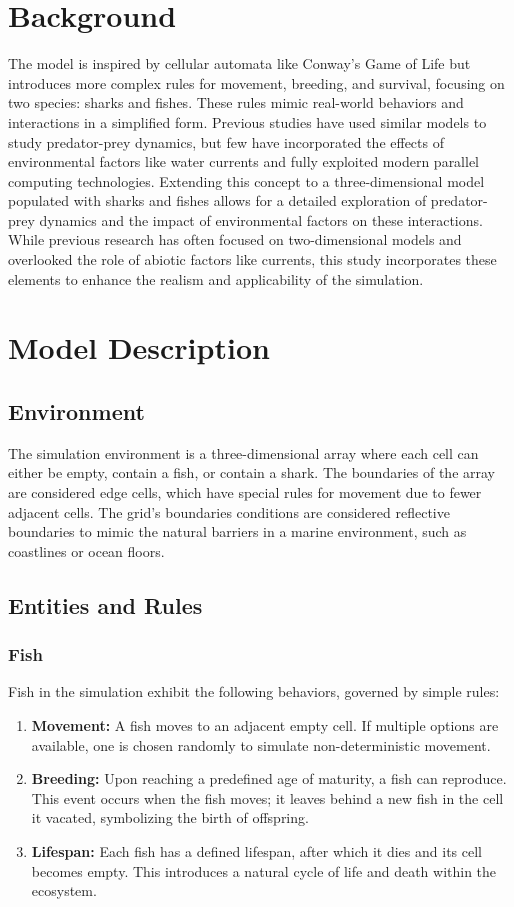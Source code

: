 \documentclass[conference,compsoc]{IEEEtran}
\begin{document}
\section{Background}
The model is inspired by cellular automata like Conway's Game of Life but introduces more complex rules for movement, breeding, and survival, focusing on two species: sharks and fishes. These rules mimic real-world behaviors and interactions in a simplified form. Previous studies have used similar models to study predator-prey dynamics, but few have incorporated the effects of environmental factors like water currents and fully exploited modern parallel computing technologies. Extending this concept to a three-dimensional model populated with sharks and fishes allows for a detailed exploration of predator-prey dynamics and the impact of environmental factors on these interactions. While previous research has often focused on two-dimensional models and overlooked the role of abiotic factors like currents, this study incorporates these elements to enhance the realism and applicability of the simulation. 


\section{Model Description}

\subsection{Environment}
The simulation environment is a three-dimensional array where each cell can either be empty, contain a fish, or contain a shark. The boundaries of the array are considered edge cells, which have special rules for movement due to fewer adjacent cells. The grid's boundaries conditions are considered reflective boundaries to mimic the natural barriers in a marine environment, such as coastlines or ocean floors.

\subsection{Entities and Rules}

\subsubsection{Fish}

Fish in the simulation exhibit the following behaviors, governed by simple rules:
\begin{enumerate}
\item \textbf{Movement:} A fish moves to an adjacent empty cell. If multiple options are available, one is chosen randomly to simulate non-deterministic movement.
\item \textbf{Breeding:} Upon reaching a predefined age of maturity, a fish can reproduce. This event occurs when the fish moves; it leaves behind a new fish in the cell it vacated, symbolizing the birth of offspring.
\item \textbf{Lifespan:} Each fish has a defined lifespan, after which it dies and its cell becomes empty. This introduces a natural cycle of life and death within the ecosystem.
\end{enumerate}
\end{document}
